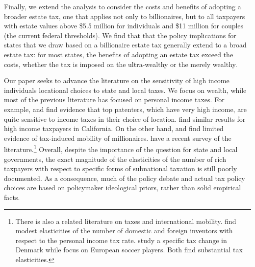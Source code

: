 \documentclass[12pt]{article}
\begin{document}
Finally, we extend the analysis to consider the costs and benefits of adopting a broader estate tax,
one that applies not only to billionaires, but to all taxpayers with estate values above \$5.5 million for individuals and \$11 million for couples (the current federal  thresholds).  
We find that that the policy implications for states that we draw based on a billionaire estate tax generally extend to a broad estate tax: for most states, the  benefits of adopting an estate tax exceed the costs, whether the tax is imposed on the ultra-wealthy or the merely wealthy.  

Our paper seeks to advance the literature on the sensitivity of high income individuals locational choices to state and local taxes. 
We focus on wealth, while most of the previous literature has focused on personal income taxes. For example, \cite{moretti/wilson:2017} and \cite{akcigit2016taxation} find evidence that top patenters, which have very high income, are quite sensitive to income taxes in their choice of location. \cite{rau} find similar results for high income taxpayers in California.  On the other hand, \cite{young2016millionaire} and \cite{young2011millionaire} find limited evidence of tax-induced mobility of millionaires. \cite{klevenJEP} have a recent survey of the literature.\footnote{There is also a related literature on taxes and international mobility. \cite{akcigit2016taxation} find modest elasticities of the number of domestic and foreign inventors with respect to the personal income tax rate.  \cite{kleven2013migration} study a specific tax change in Denmark while \cite{kleven2013taxation} focus on European soccer players. Both find substantial tax elasticities.} 
Overall, despite the importance of the question for state and local governments, the exact magnitude of the elasticities of the number of rich taxpayers with respect to specific forms of subnational taxation is still poorly documented.  As a consequence, much of the policy debate and actual tax policy choices are based on policymaker ideological priors, rather than solid empirical facts. 
\end{document}
